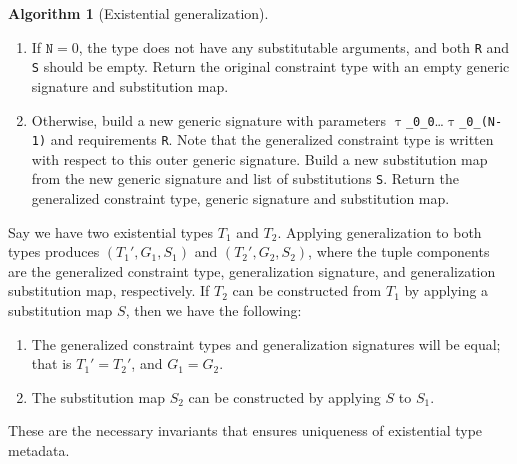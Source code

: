 \documentclass[a4paper,headsepline,bibliography=totoc,toc=flat,fleqn,twoside=semi]{scrbook}
\theoremstyle{definition}
\theoremstyle{definition}
\theoremstyle{definition}
\newtheorem{algorithm}{Algorithm}[chapter]
\newcommand{\ttgp}[2]{\texttt{$\uptau$\_#1\_#2}}
\begin{document}
\begin{algorithm}[Existential generalization]
\begin{enumerate}
\item If $\texttt{N}=0$, the type does not have any substitutable arguments, and both \texttt{R} and \texttt{S} should be empty. Return the original constraint type with an empty generic signature and substitution map.
\item Otherwise, build a new generic signature with parameters \texttt{\ttgp{0}{0}}\ldots\ttgp{0}{(N-1)} and requirements \texttt{R}. Note that the generalized constraint type is written with respect to this outer generic signature. Build a new substitution map from the new generic signature and list of substitutions \texttt{S}. Return the generalized constraint type, generic signature and substitution map.
\end{enumerate}
\end{algorithm}

Say we have two existential types $T_1$ and $T_2$. Applying generalization to both types produces $(T_1', G_1, S_1)$ and $(T_2', G_2, S_2)$, where the tuple components are the generalized constraint type, generalization signature, and generalization substitution map, respectively. If $T_2$ can be constructed from $T_1$ by applying a substitution map $S$, then we have the following:
\begin{enumerate}
\item The generalized constraint types and generalization signatures will be equal; that is $T_1'=T_2'$, and $G_1=G_2$.
\item The substitution map $S_2$ can be constructed by applying $S$ to $S_1$.
\end{enumerate}
These are the necessary invariants that ensures uniqueness of existential type metadata.
\end{document}
